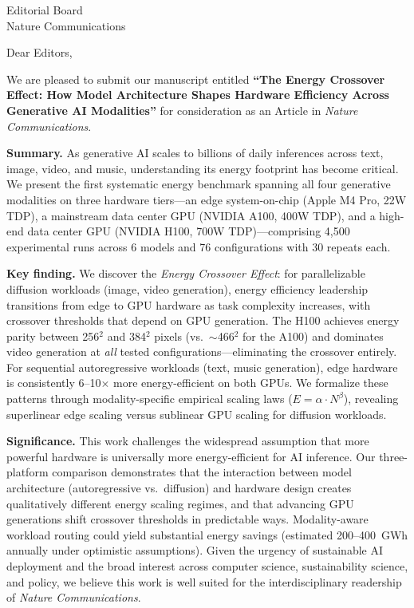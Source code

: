 \documentclass[11pt]{letter}
\begin{document}
\begin{letter}{Editorial Board\\Nature Communications}

\opening{Dear Editors,}

We are pleased to submit our manuscript entitled \textbf{``The Energy Crossover Effect: How Model Architecture Shapes Hardware Efficiency Across Generative AI Modalities''} for consideration as an Article in \textit{Nature Communications}.

\textbf{Summary.} As generative AI scales to billions of daily inferences across text, image, video, and music, understanding its energy footprint has become critical. We present the first systematic energy benchmark spanning all four generative modalities on three hardware tiers---an edge system-on-chip (Apple M4 Pro, 22W TDP), a mainstream data center GPU (NVIDIA A100, 400W TDP), and a high-end data center GPU (NVIDIA H100, 700W TDP)---comprising 4,500 experimental runs across 6 models and 76 configurations with 30 repeats each.

\textbf{Key finding.} We discover the \textit{Energy Crossover Effect}: for parallelizable diffusion workloads (image, video generation), energy efficiency leadership transitions from edge to GPU hardware as task complexity increases, with crossover thresholds that depend on GPU generation. The H100 achieves energy parity between 256$^2$ and 384$^2$ pixels (vs.\ $\sim$466$^2$ for the A100) and dominates video generation at \textit{all} tested configurations---eliminating the crossover entirely. For sequential autoregressive workloads (text, music generation), edge hardware is consistently 6--10$\times$ more energy-efficient on both GPUs. We formalize these patterns through modality-specific empirical scaling laws ($E = \alpha \cdot N^\beta$), revealing superlinear edge scaling versus sublinear GPU scaling for diffusion workloads.

\textbf{Significance.} This work challenges the widespread assumption that more powerful hardware is universally more energy-efficient for AI inference. Our three-platform comparison demonstrates that the interaction between model architecture (autoregressive vs.\ diffusion) and hardware design creates qualitatively different energy scaling regimes, and that advancing GPU generations shift crossover thresholds in predictable ways. Modality-aware workload routing could yield substantial energy savings (estimated 200--400~GWh annually under optimistic assumptions). Given the urgency of sustainable AI deployment and the broad interest across computer science, sustainability science, and policy, we believe this work is well suited for the interdisciplinary readership of \textit{Nature Communications}.


\end{letter}
\end{document}

